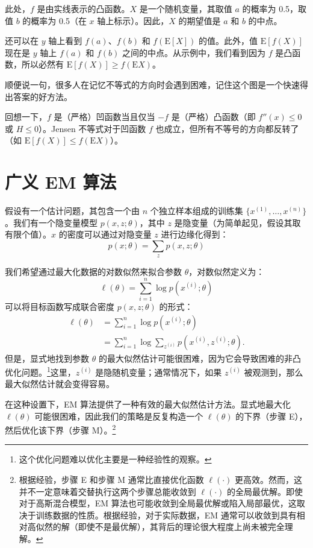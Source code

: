 此处，$f$ 是由实线表示的凸函数。$X$ 是一个随机变量，其取值 $a$ 的概率为 0.5，取值 $b$ 的概率为 0.5（在 $x$ 轴上标示）。因此，$X$ 的期望值是 $a$ 和 $b$ 的中点。

还可以在 $y$ 轴上看到 $f(a)$、$f(b)$ 和 $f(\mathrm{E}[X])$ 的值。此外，值 $\mathrm{E}[f(X)]$ 现在是 $y$ 轴上 $f(a)$ 和 $f(b)$ 之间的中点。从示例中，我们看到因为 $f$ 是凸函数，所以必然有 $\mathrm{E}[f(X)] \geq f(\mathrm{E}X)$。

顺便说一句，很多人在记忆不等式的方向时会遇到困难，记住这个图是一个快速得出答案的好方法。

\begin{remark*}
    回想一下，$f$ 是（严格）凹函数当且仅当 $-f$ 是（严格）凸函数（即 $f''(x) \leq 0$ 或 $H \leq 0$）。Jensen 不等式对于凹函数 $f$ 也成立，但所有不等号的方向都反转了（如 $\mathrm{E}[f(X)] \leq f(\mathrm{E}X)$）。
\end{remark*}

\section{广义 EM 算法}

假设有一个估计问题，其包含一个由 $n$ 个独立样本组成的训练集 $\{x^{(1)}, \dots, x^{(n)}\}$。我们有一个隐变量模型 $p(x, z; \theta)$，其中 $z$ 是隐变量（为简单起见，假设其取有限个值）。$x$ 的密度可以通过对隐变量 $z$ 进行边缘化得到：
\begin{equation}
    p(x; \theta) = \sum_z p(x, z; \theta)
    \label{eq:11.1}
\end{equation}

我们希望通过最大化数据的对数似然来拟合参数 $\theta$，对数似然定义为：
\begin{equation}
    \ell(\theta) = \sum_{i=1}^n \log p(x^{(i)}; \theta)
    \label{eq:11.2}
\end{equation}
可以将目标函数写成联合密度 $p(x, z; \theta)$ 的形式：
\begin{align}
    \ell(\theta) 
    &= \sum_{i=1}^n \log p(x^{(i)}; \theta) \label{eq:11.3} \\
    &= \sum_{i=1}^n \log \sum_{z^{(i)}} p(x^{(i)}, z^{(i)}; \theta). \label{eq:11.4}
\end{align}
但是，显式地找到参数 $\theta$ 的最大似然估计可能很困难，因为它会导致困难的非凸优化问题。\footnote{这个优化问题难以优化主要是一种经验性的观察。}这里，$z^{(i)}$ 是隐随机变量；通常情况下，如果 $z^{(i)}$ 被观测到，那么最大似然估计就会变得容易。

在这种设置下，EM 算法提供了一种有效的最大似然估计方法。显式地最大化 $\ell(\theta)$ 可能很困难，因此我们的策略是反复构造一个 $\ell(\theta)$ 的下界（步骤 E），然后优化该下界（步骤 M）。\footnote{根据经验，步骤 E 和步骤 M 通常比直接优化函数 $\ell(\cdot)$ 更高效。然而，这并不一定意味着交替执行这两个步骤总能收敛到 $\ell(\cdot)$ 的全局最优解。即使对于高斯混合模型，EM 算法也可能收敛到全局最优解或陷入局部最优，这取决于训练数据的性质。根据经验，对于实际数据，EM 通常可以收敛到具有相对高似然的解（即使不是最优解），其背后的理论很大程度上尚未被完全理解。}


